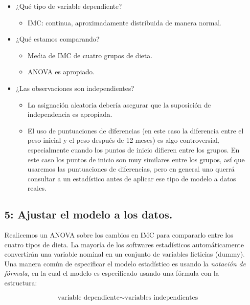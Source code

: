 \documentclass[
  12pt,
]{book}
\providecommand{\tightlist}{%
  \setlength{\itemsep}{0pt}\setlength{\parskip}{0pt}}
\begin{document}
\begin{itemize}
\tightlist
\item
  ¿Qué tipo de variable dependiente?

  \begin{itemize}
  \tightlist
  \item
    IMC: continua, aproximadamente distribuida de manera normal.
  \end{itemize}
\item
  ¿Qué estamos comparando?

  \begin{itemize}
  \tightlist
  \item
    Media de IMC de cuatro grupos de dieta.
  \item
    ANOVA es apropiado.
  \end{itemize}
\item
  ¿Las observaciones son independientes?

  \begin{itemize}
  \tightlist
  \item
    La asignación aleatoria debería asegurar que la suposición de independencia es apropiada.
  \item
    El uso de puntuaciones de diferencias (en este caso la diferencia entre el peso inicial y el peso después de 12 meses) es algo controversial, especialmente cuando los puntos de inicio difieren entre los grupos. En este caso los puntos de inicio son muy similares entre los grupos, así que usaremos las puntuaciones de diferencias, pero en general uno querrá consultar a un estadístico antes de aplicar ese tipo de modelo a datos reales.
  \end{itemize}
\end{itemize}

\hypertarget{ajustar-el-modelo-a-los-datos.}{%
\subsection{5: Ajustar el modelo a los datos.}\label{ajustar-el-modelo-a-los-datos.}}

Realicemos un ANOVA sobre los cambios en IMC para compararlo entre los cuatro tipos de dieta. La mayoría de los softwares estadísticos automáticamente convertirán una variable nominal en un conjunto de variables ficticias (dummy). Una manera común de especificar el modelo estadístico es usando la \emph{notación de fórmula}, en la cual el modelo es especificado usando una fórmula con la estructura:

\[ 
\text{variable dependiente} \sim \text{variables independientes}
\]
\end{document}
